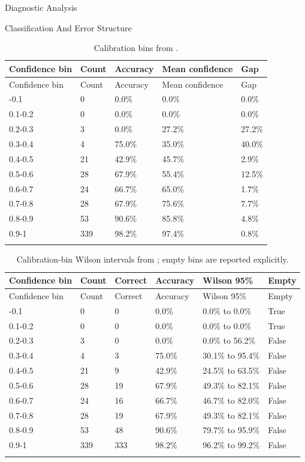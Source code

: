 \documentclass[
  ignorenonframetext,
]{beamer}
\begin{document}
\begin{frame}{Diagnostic Analysis}
\begin{block}{Classification And Error Structure}
\begin{longtable}[]{@{}lllll@{}}
\caption{Calibration bins from
\protect{}.}\label{tbl:calibration-bins}\tabularnewline
\toprule\noalign{}
Confidence bin & Count & Accuracy & Mean confidence & Gap \\
\midrule\noalign{}
\endfirsthead
\toprule\noalign{}
Confidence bin & Count & Accuracy & Mean confidence & Gap \\
\midrule\noalign{}
\endhead
0-0.1 & 0 & 0.0\% & 0.0\% & 0.0\% \\
0.1-0.2 & 0 & 0.0\% & 0.0\% & 0.0\% \\
0.2-0.3 & 3 & 0.0\% & 27.2\% & 27.2\% \\
0.3-0.4 & 4 & 75.0\% & 35.0\% & 40.0\% \\
0.4-0.5 & 21 & 42.9\% & 45.7\% & 2.9\% \\
0.5-0.6 & 28 & 67.9\% & 55.4\% & 12.5\% \\
0.6-0.7 & 24 & 66.7\% & 65.0\% & 1.7\% \\
0.7-0.8 & 28 & 67.9\% & 75.6\% & 7.7\% \\
0.8-0.9 & 53 & 90.6\% & 85.8\% & 4.8\% \\
0.9-1 & 339 & 98.2\% & 97.4\% & 0.8\% \\
\bottomrule\noalign{}
\end{longtable}

\begin{longtable}[]{@{}llllll@{}}
\caption{Calibration-bin Wilson intervals from
\protect{}; empty
bins are reported
explicitly.}\label{tbl:calibration-bin-intervals}\tabularnewline
\toprule\noalign{}
Confidence bin & Count & Correct & Accuracy & Wilson 95\% & Empty \\
\midrule\noalign{}
\endfirsthead
\toprule\noalign{}
Confidence bin & Count & Correct & Accuracy & Wilson 95\% & Empty \\
\midrule\noalign{}
\endhead
0-0.1 & 0 & 0 & 0.0\% & 0.0\% to 0.0\% & True \\
0.1-0.2 & 0 & 0 & 0.0\% & 0.0\% to 0.0\% & True \\
0.2-0.3 & 3 & 0 & 0.0\% & 0.0\% to 56.2\% & False \\
0.3-0.4 & 4 & 3 & 75.0\% & 30.1\% to 95.4\% & False \\
0.4-0.5 & 21 & 9 & 42.9\% & 24.5\% to 63.5\% & False \\
0.5-0.6 & 28 & 19 & 67.9\% & 49.3\% to 82.1\% & False \\
0.6-0.7 & 24 & 16 & 66.7\% & 46.7\% to 82.0\% & False \\
0.7-0.8 & 28 & 19 & 67.9\% & 49.3\% to 82.1\% & False \\
0.8-0.9 & 53 & 48 & 90.6\% & 79.7\% to 95.9\% & False \\
0.9-1 & 339 & 333 & 98.2\% & 96.2\% to 99.2\% & False \\
\bottomrule\noalign{}
\end{longtable}


\end{block}
\end{frame}
\end{document}
